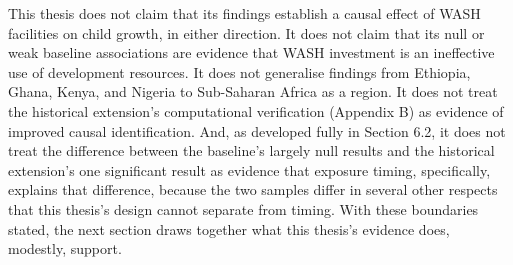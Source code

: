 This thesis does not claim that its findings establish a causal effect of WASH facilities on child growth, in either direction. It does not claim that its null or weak baseline associations are evidence that WASH investment is an ineffective use of development resources. It does not generalise findings from Ethiopia, Ghana, Kenya, and Nigeria to Sub-Saharan Africa as a region. It does not treat the historical extension's computational verification (Appendix B) as evidence of improved causal identification. And, as developed fully in Section 6.2, it does not treat the difference between the baseline's largely null results and the historical extension's one significant result as evidence that exposure timing, specifically, explains that difference, because the two samples differ in several other respects that this thesis's design cannot separate from timing. With these boundaries stated, the next section draws together what this thesis's evidence does, modestly, support.
